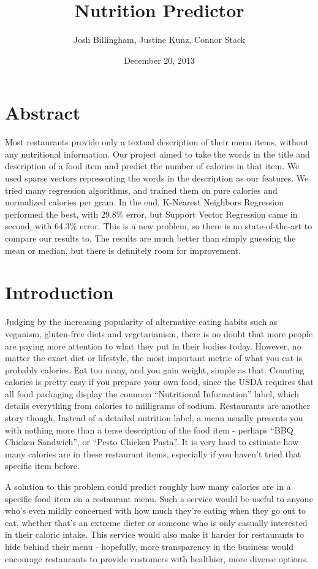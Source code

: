 \documentclass{article}
\title{Nutrition Predictor}
\author{Josh Billingham, Justine Kunz, Connor Stack}
\date{December 20, 2013}
\begin{document}
\maketitle

\section{Abstract}

Most restaurants provide only a textual description of their menu items, without any nutritional information. Our project aimed to take the words in the title and description of a food item and predict the number of calories in that item. We used sparse vectors representing the words in the description as our features. We tried many regression algorithms, and trained them on pure calories and normalized calories per gram. In the end, K-Nearest Neighbors Regression performed the best, with 29.8\% error, but Support Vector Regression came in second, with 64.3\% error. This is a new problem, so there is no state-of-the-art to compare our results to. The results are much better than simply guessing the mean or median, but there is definitely room for improvement.

\section{Introduction}
Judging by the increasing popularity of alternative eating habits such as veganism, gluten-free diets and vegetarianism, there is no doubt that more people are paying more attention to what they put in their bodies today. However, no matter the exact diet or lifestyle, the most important metric of what you eat is probably calories. Eat too many, and you gain weight, simple as that. Counting calories is pretty easy if you prepare your own food, since the USDA requires that all food packaging display the common “Nutritional Information” label, which details everything from calories to milligrams of sodium. Restaurants are another story though. Instead of a detailed nutrition label, a menu usually presents you with nothing more than a terse description of the food item - perhaps “BBQ Chicken Sandwich”, or “Pesto Chicken Pasta”. It is very hard to estimate how many calories are in these restaurant items, especially if you haven’t tried that specific item before.

A solution to this problem could predict roughly how many calories are in a specific food item on a restaurant menu. Such a service would be useful to anyone who’s even mildly concerned with how much they’re eating when they go out to eat, whether that’s an extreme dieter or someone who is only casually interested in their caloric intake. This service would also make it harder for restaurants to hide behind their menu - hopefully, more transparency in the business would encourage restaurants to provide customers with healthier, more diverse options.
\end{document}
